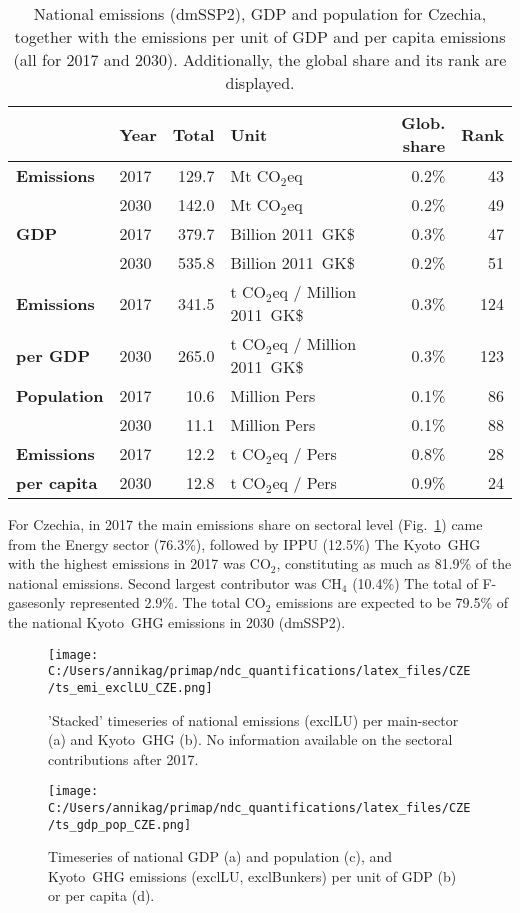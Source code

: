 \documentclass[12pt]{article}
\begin{document}
 \begin{table}[H]
 \centering
 \caption{National emissions (dmSSP2), GDP and population for Czechia, together with the emissions per unit of GDP and per capita emissions (all for 2017 and 2030). 
 Additionally, the global share and its rank are displayed.}
 \label{tab:overview}
 \begin{tabular}{l || l r l r r}
 \bfseries  & \bfseries Year & \bfseries Total & \bfseries Unit & \bfseries Glob. share & \bfseries Rank \tabularnewline \hline \hline
 \bfseries Emissions & 2017 & 129.7 & Mt CO$_2$eq & 0.2\% & 43 \tabularnewline 
 \bfseries  & 2030 & 142.0 & Mt CO$_2$eq & 0.2\% & 49 \tabularnewline \hline
 \bfseries GDP & 2017 & 379.7 & Billion 2011~GK\$ & 0.3\% & 47 \tabularnewline 
 \bfseries  & 2030 & 535.8 & Billion 2011~GK\$ & 0.2\% & 51 \tabularnewline \hline
 \bfseries Emissions & 2017 & 341.5 & t CO$_2$eq / Million 2011~GK\$ & 0.3\% & 124 \tabularnewline 
 \bfseries per GDP & 2030 & 265.0 & t CO$_2$eq / Million 2011~GK\$ & 0.3\% & 123 \tabularnewline \hline
 \bfseries Population & 2017 & 10.6 & Million Pers & 0.1\% & 86 \tabularnewline 
 \bfseries  & 2030 & 11.1 & Million Pers & 0.1\% & 88 \tabularnewline \hline
 \bfseries Emissions & 2017 & 12.2 & t CO$_2$eq /  Pers & 0.8\% & 28 \tabularnewline 
 \bfseries per capita & 2030 & 12.8 & t CO$_2$eq /  Pers & 0.9\% & 24 \tabularnewline 
 \end{tabular}
 \end{table}

 For Czechia, in 2017 the main emissions share on sectoral level (Fig.~\ref{fig:tsEmi}) came from the Energy sector (76.3\%), followed by IPPU (12.5\%)
 The Kyoto~GHG with the highest emissions in 2017 was CO$_2$, constituting as much as 81.9\% of the national emissions. 
 Second largest contributor was CH$_4$ (10.4\%)
 The total of F-gasesonly represented 2.9\%.
 The total CO$_2$ emissions are expected to be 79.5\% of the national Kyoto~GHG emissions in 2030 (dmSSP2).

 \begin{figure}[H]
 \centering
 \texttt{[image: C:/Users/annikag/primap/ndc\_quantifications/latex\_files/CZE/ts\_emi\_exclLU\_CZE.png]}
 \caption{'Stacked' timeseries of national emissions (exclLU) per main-sector (a) and Kyoto~GHG (b). 
 No information available on the sectoral contributions after 2017.}
 \label{fig:tsEmi}
 \end{figure}

 \begin{figure}[H]
 \centering
 \texttt{[image: C:/Users/annikag/primap/ndc\_quantifications/latex\_files/CZE/ts\_gdp\_pop\_CZE.png]}
 \caption{Timeseries of national GDP (a) and population (c), and Kyoto~GHG emissions (exclLU, exclBunkers) per unit of GDP (b) or per capita (d).}
 \label{fig:tsSocioEco}
 \end{figure}
\end{document}
